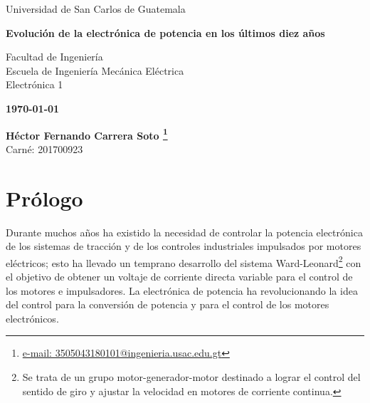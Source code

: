 \documentclass[12pt,letterpaper,superscriptaddress]{article}
\begin{document}
\begin{titlepage}
\begin{center}
\begin{center}
\begin{Large}
Universidad de San Carlos de Guatemala
\end{Large}
\end{center}



\begin{center}
\begin{Huge}
\textbf{Evolución de la electrónica de potencia en los últimos diez años}
\end{Huge}
\end{center}



\begin{center}
\begin{normalsize}
Facultad de Ingeniería\\
Escuela de Ingeniería Mecánica Eléctrica\\
Electrónica 1\\
\end{normalsize}
\end{center}



\begin{center}
\textbf{\today}
\end{center}


\textbf{Héctor Fernando Carrera Soto \footnote{\href{3505043180101@ingenieria.usac.edu.gt}{e-mail: 3505043180101@ingenieria.usac.edu.gt}}}\\
Carné: 201700923
\end{center}
\end{titlepage}

\tableofcontents
\clearpage



\section{Prólogo}

Durante muchos años ha existido la necesidad de controlar la potencia electrónica de los sistemas de tracción y de los controles industriales impulsados por motores eléctricos; esto ha llevado un temprano desarrollo del sistema Ward-Leonard\footnote{Se trata de un grupo motor-generador-motor destinado a lograr el control del sentido de giro y ajustar la velocidad en motores de corriente continua.} con el objetivo de obtener un voltaje de corriente directa variable para el control de los motores e impulsadores. La electrónica de potencia ha revolucionando la idea del control para la conversión de potencia y para el control de los motores electrónicos.
\end{document}
